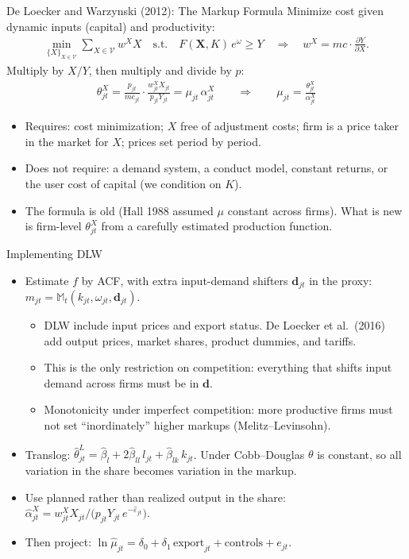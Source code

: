 \documentclass[aspectratio=169,10pt]{beamer}
\begin{document}
\begin{frame}{De Loecker and Warzynski (2012): The Markup Formula}
Minimize cost given dynamic inputs (capital) and productivity:
\begin{align*}
\min_{\{X\}_{X \in \mathcal{V}}} \sum_{X \in \mathcal{V}} w^X X \quad \text{s.t.}\quad F(\mathbf{X}, K)\, e^{\omega} \ge Y
\quad\Longrightarrow\quad w^X = mc \cdot \frac{\partial Y}{\partial X}.
\end{align*}
Multiply by $X/Y$, then multiply and divide by $p$:
\begin{align*}
\theta^X_{jt} = \frac{p_{jt}}{mc_{jt}} \cdot \frac{w^X_{jt} X_{jt}}{p_{jt} Y_{jt}} = \mu_{jt}\, \alpha^X_{jt}
\qquad\Longrightarrow\qquad
\boxed{\mu_{jt} = \frac{\theta^X_{jt}}{\alpha^X_{jt}}}
\end{align*}
\begin{itemize}
\item Requires: cost minimization; $X$ free of adjustment costs; firm is a price taker in the market for $X$; prices set period by period.
\item Does \alert{not} require: a demand system, a conduct model, constant returns, or the user cost of capital (we condition on $K$).
\item The formula is old (Hall 1988 assumed $\mu$ constant across firms). What is new is firm-level $\theta^X_{jt}$ from a carefully estimated production function.
\end{itemize}
\end{frame}


\begin{frame}{Implementing DLW}
\begin{itemize}
\item Estimate $f$ by ACF, with extra input-demand shifters $\mathbf{d}_{jt}$ in the proxy: $m_{jt} = \mathbb{M}_t(k_{jt}, \omega_{jt}, \mathbf{d}_{jt})$.
\begin{itemize}
\item DLW include input prices and export status. De Loecker et al.\ (2016) add output prices, market shares, product dummies, and tariffs.
\item This is the only restriction on competition: \alert{everything} that shifts input demand across firms must be in $\mathbf{d}$.
\item Monotonicity under imperfect competition: more productive firms must not set ``inordinately'' higher markups (Melitz--Levinsohn).
\end{itemize}
\item Translog: $\hat\theta^L_{jt} = \hat\beta_l + 2\hat\beta_{ll}\, l_{jt} + \hat\beta_{lk}\, k_{jt}$. Under Cobb--Douglas $\theta$ is constant, so \alert{all} variation in the share becomes variation in the markup.
\item Use planned rather than realized output in the share: $\hat\alpha^X_{jt} = w^X_{jt} X_{jt} / \big(p_{jt} Y_{jt}\, e^{-\hat\varepsilon_{jt}}\big)$.
\item Then project: $\ln \hat\mu_{jt} = \delta_0 + \delta_1\, \text{export}_{jt} + \text{controls} + e_{jt}$.
\end{itemize}
\end{frame}
\end{document}
